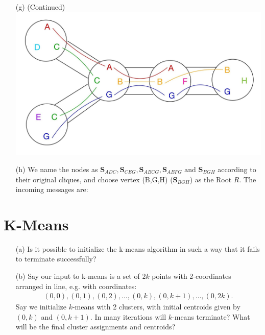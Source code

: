 \documentclass[11pt]{article}
\renewcommand{\vec}[1]{\mathbf{#1}}
\begin{document}
\begin{answertext}{23cm}{}

\begin{itemize}
\item[(g)] (Continued)\\
\includegraphics[scale=0.23]{tree}
\item[(h)] We name the nodes as $\vec{S}_{ADC},\vec{S}_{CEG},\vec{S}_{ABCG},\vec{S}_{ABFG}\text{ and }\vec{S}_{BGH}$ according to their original cliques, and choose vertex (B,G,H) ($\vec{S}_{BGH}$) as the Root $R$. The incoming messages are:

\end{itemize} 
\end{answertext}
\pagebreak


\section*{K-Means}

\begin{enumerate}
\item[(a)] Is it possible to initialize the k-means algorithm in such a way that it fails to terminate successfully?

\item[(b)] Say our input to k-means is a set of $2k$ points with 2-coordinates arranged in line, e.g. with coordinates:
{\small
\begin{align*}
(0,0), (0,1), (0, 2), \ldots, (0,k), (0,k+1), \ldots, (0,2k).
\end{align*}
}
Say we initialize $k$-means with 2 clusters, with initial centroids given by $(0,k)$ and $(0,k+1)$.  In many iterations will $k$-means terminate?  What will be the final cluster assignments and centroids?
\end{enumerate}
\end{document}
